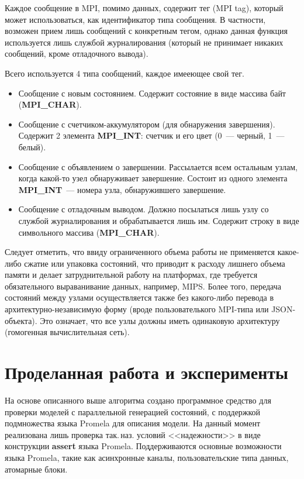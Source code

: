 \documentclass[12pt,a4paper,fleqn]{article}
\newcommand{\Code}[1]{\textbf{\mbox{#1}}}
\begin{document}
Каждое сообщение в MPI, помимо данных, содержит тег (MPI tag), который может использоваться, как
идентификатор типа сообщения. В частности, возможен прием лишь сообщений с конкретным тегом, однако
данная функция используется лишь службой журналирования (который не принимает никаких сообщений,
кроме отладочного вывода).

Всего используется 4 типа сообщений, каждое имееющее свой тег.
\begin{itemize}
\item Сообщение с новым состоянием. Содержит состояние в виде массива байт
  (\Code{MPI\_CHAR}).
\item Сообщение с счетчиком-аккумулятором (для обнаружения завершения). Содержит 2 элемента
  \Code{MPI\_INT}: счетчик и его цвет (0~--- черный, 1~--- белый).
\item Сообщение с объявлением о завершении. Рассылается всем остальным узлам, когда
  какой-то узел обнаруживает завершение. Состоит из одного элемента \Code{MPI\_INT}~---
  номера узла, обнаружившего завершение.
\item Сообщение с отладочным выводом. Должно посылаться лишь узлу со службой журналирования и
  обрабатывается лишь им. Содержит строку в виде символьного массива (\Code{MPI\_CHAR}).
\end{itemize}

Следует отметить, что ввиду ограниченного объема работы не применяется какое-либо сжатие или
упаковка состояний, что приводит к расходу лишнего объема памяти и делает затруднительной работу на
платформах, где требуется обязательного выраванивание данных, например, MIPS. Более того, передача
состояний между узлами осуществляется также без какого-либо перевода в архитектурно-независимую
форму (вроде пользователького MPI-типа или JSON-объекта). Это означает, что все узлы должны иметь
одинаковую архитектуру (гомогенная вычислительная сеть).

\section{Проделанная работа и эксперименты}

На основе описанного выше алгоритма создано программное средство для проверки моделей с
параллельной генерацией состояний, с поддержкой подмножества языка Promela для описания
модели. На данный момент реализована лишь проверка так.\,наз. условий <<надежности>> в
виде конструкции \Code{assert} языка Promela. Поддерживаются основные возможности языка
Promela, такие как асинхронные каналы, пользовательские типа данных, атомарные блоки.
\end{document}
